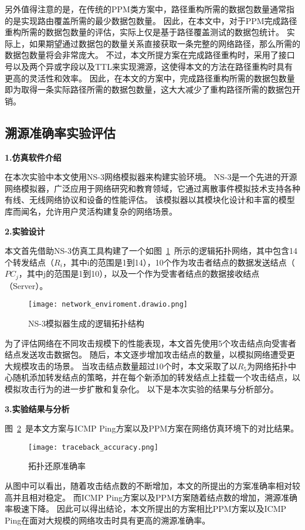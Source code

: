 另外值得注意的是，在传统的PPM类方案中，路径重构所需的数据包数量通常指的是实现路由覆盖所需的最少数据包数量。
因此，在本文中，对于PPM完成路径重构所需的数据包数量的评估，实际上仅是基于路径覆盖测试的数据包统计。
实际上，如果期望通过数据包的数量关系直接获取一条完整的网络路径，那么所需的数据包数量将会非常庞大。
不过，本文所提方案在完成路径重构时，采用了接口号以及两个异或字段以及TTL来实现溯源，这使得本文的方法在路径重构时具有更高的灵活性和效率。
因此，在本文的方案中，完成路径重构所需的数据包数量即为取得一条实际路径所需的数据包数量，这大大减少了重构路径所需的数据包开销。
\subsection{溯源准确率实验评估}
\textbf{1.仿真软件介绍}\par
在本次实验中本文使用NS-3网络模拟器来构建实验环境。
NS-3是一个先进的开源网络模拟器，广泛应用于网络研究和教育领域，它通过离散事件模拟技术支持各种有线、无线网络协议和设备的性能评估。
该模拟器以其模块化设计和丰富的模型库而闻名，允许用户灵活构建复杂的网络场景。\par
\textbf{2.实验设计}\par
本文首先借助NS-3仿真工具构建了一个如图~\ref{fig:network_enviroment}~所示的逻辑拓扑网络，其中包含14个转发结点（$R_i$，其中i的范围是1到14），10个作为攻击者结点的数据发送结点（$PC_j$，其中j的范围是1到10），以及一个作为受害者结点的数据接收结点（Server）。
\begin{figure}[h]
	\centering
	\texttt{[image: network\_enviroment.drawio.png]}
	\caption{NS-3模拟器生成的逻辑拓扑结构}
	\label{fig:network_enviroment}
\end{figure}
为了评估网络在不同攻击规模下的性能表现，本文首先使用5个攻击结点向受害者结点发送攻击数据包。
随后，本文逐步增加攻击结点的数量，以模拟网络遭受更大规模攻击的场景。
当攻击结点数量超过10个时，本文采取了以$R_5$为网络拓扑中心随机添加转发结点的策略，并在每个新添加的转发结点上挂载一个攻击结点，以模拟攻击行为的进一步扩散和复杂化。
以下是本次实验的结果与分析部分。\par
\textbf{3.实验结果与分析}\par
图~\ref{fig:traceback_accuracy}~是本文方案与ICMP Ping方案以及PPM方案在网络仿真环境下的对比结果。
\begin{figure}[h]
	\centering
	\texttt{[image: traceback\_accuracy.png]}
	\caption{拓扑还原准确率}
	\label{fig:traceback_accuracy}
\end{figure}

从图中可以看出，随着攻击结点数的不断增加，本文的所提出的方案准确率相对较高并且相对稳定。
而ICMP Ping方案以及PPM方案随着结点数的增加，溯源准确率极速下降。
因此可以得出结论，本文所提出的方案相比PPM方案以及ICMP Ping在面对大规模的网络攻击时具有更高的溯源准确率。


